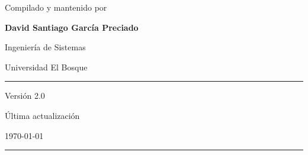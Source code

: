 \begin{titlepage}
{\large
Compilado y mantenido por
}

\vspace{0.25cm}

{\LARGE
\textbf{David Santiago García Preciado}
}

\vspace{0.25cm}

{\large
Ingeniería de Sistemas
}

{\large
Universidad El Bosque
}

\vspace{1cm}

{\color{black}\rule{0.7\textwidth}{1pt}}

\vspace{0.5cm}

{\large
Versión 2.0
}

\vspace{0.15cm}

{\large
Última actualización
}

{\large
\today   %
}

\vspace{0.8cm}

{\color{black}\rule{\textwidth}{2pt}}

\end{titlepage}
